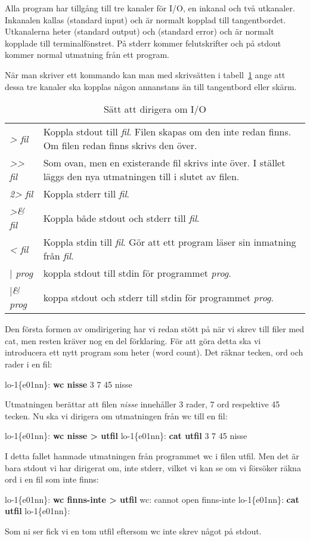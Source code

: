 \documentclass[a4paper,twocolumn]{book}
\begin{document}
Alla program har tillgång till tre kanaler för I/O, en inkanal och två
utkanaler. Inkanalen kallas  (standard input) och är
normalt kopplad till tangentbordet. Utkanalerna heter 
(standard output) och  (standard error) och är normalt
kopplade till terminalfönstret. På stderr kommer felutskrifter och på
stdout kommer normal utmatning från ett program.

När man skriver ett kommando kan man med skrivsätten i
tabell~\ref{tab:io-redir} ange att dessa tre kanaler ska kopplas någon
annanstans än till tangentbord eller skärm.
\begin{table}[tbp]
  \hidettindex{<}\hidettindex{>}\hidettindex{>>}%
  \begin{tabularx}{\linewidth}{|lX|}\hline
    \emph{> fil}  & Koppla stdout till \emph{fil}. Filen skapas om den
    inte redan finns. Om filen redan finns skrivs den över.\\ 
    \emph{>{}> fil} & Som ovan, men en existerande fil skrivs inte
    över. I stället läggs den nya utmatningen till i slutet av filen. \\
    \emph{2> fil} & Koppla stderr till \emph{fil}. \\
    \emph{>\& fil} & Koppla både stdout och stderr till \emph{fil}. \\
    \emph{< fil} & Koppla stdin till \emph{fil}. Gör att ett program
    läser sin inmatning från \emph{fil}. \\
    \emph{$\mid$ prog} & koppla stdout till stdin för programmet
    \emph{prog}. \\
    \emph{$\mid$\& prog} & koppa stdout och stderr till stdin för programmet
    \emph{prog}. \\
    \hline
  \end{tabularx}
  \caption{Sätt att dirigera om I/O}
  \label{tab:io-redir}
\end{table}
Den första formen av omdirigering har vi redan stött på när vi skrev till
filer med cat, men resten kräver nog en del förklaring. För att göra
detta ska vi introducera ett nytt program som heter  (word
count). Det räknar tecken, ord och rader i en fil:
\begin{example}
lo-1\{e01nn\}: \textbf{wc nisse}
       3       7      45 nisse
\end{example}
Utmatningen berättar att filen \emph{nisse} innehåller 3 rader, 7 ord
respektive 45 tecken. Nu ska vi dirigera om utmatningen från wc till
en fil:
\begin{example}
lo-1\{e01nn\}: \textbf{wc nisse > utfil}
lo-1\{e01nn\}: \textbf{cat utfil}
       3       7      45 nisse
\end{example}
I detta fallet hamnade utmatningen från programmet wc i filen
utfil. Men det är bara stdout vi har dirigerat om, inte stderr, vilket
vi kan se om vi försöker räkna ord i en fil som inte finns:
\begin{example}
lo-1\{e01nn\}: \textbf{wc finns-inte > utfil}
wc: cannot open finns-inte
lo-1\{e01nn\}: \textbf{cat utfil}
lo-1\{e01nn\}: 
\end{example}
Som ni ser fick vi en tom utfil eftersom wc inte skrev något på
stdout.
\end{document}
